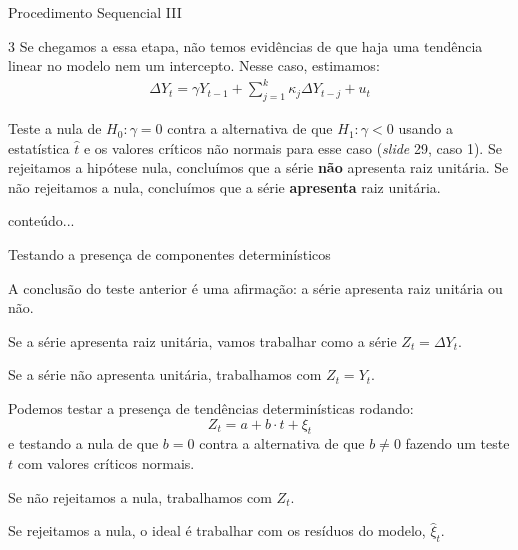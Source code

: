 \documentclass[11pt]{beamer}
\newenvironment{wideenumerate}{\enumerate\addtolength{\itemsep}{10pt}}{\endenumerate}
\newenvironment{halfwideitemize}{\itemize\addtolength{\itemsep}{0.5em}}{\enditemize}
\begin{document}
\begin{frame}{Procedimento Sequencial III}
	\begin{wideenumerate}
		\item[3] Se chegamos a essa etapa, não temos evidências de que haja uma tendência linear no modelo nem um intercepto. Nesse caso, estimamos:
		\begin{equation}
			\begin{aligned}
				\Delta Y_t = \gamma Y_{t-1} +  \sum_{j=1}^k \kappa_j \Delta Y_{t-j} + u_t
			\end{aligned}
		\end{equation}
		
		Teste a nula de $H_0: \gamma = 0$ contra a alternativa de que $H_1: \gamma < 0$ usando a estatística $\hat{t}$ e os valores críticos não normais para esse caso (\textit{slide} 29, caso 1). Se rejeitamos a hipótese nula, concluímos que a série \textbf{não} apresenta raiz unitária. Se não rejeitamos a nula, concluímos que a série \textbf{apresenta} raiz unitária.
		
	\end{wideenumerate}
	
\end{frame}

\begin{frame}{\citet{Elliott1996} }
	conteúdo...
\end{frame}

\begin{frame}{Testando a presença de componentes determinísticos}
	\begin{halfwideitemize}
		\item A conclusão do teste anterior é uma afirmação: a série apresenta raiz unitária ou não.
		\item Se a série apresenta raiz unitária, vamos trabalhar como a série $Z_t = \Delta Y_t$.
		\item Se a série não apresenta unitária, trabalhamos com $Z_t = Y_t$.
		\item Podemos testar a presença de tendências determinísticas rodando:
		\begin{equation}
			Z_t = a + b \cdot t + \xi_t
		\end{equation}
		e testando a nula de que $b=0$ contra a alternativa de que $b \neq 0$ fazendo um teste $t$ com valores críticos normais.
		\begin{halfwideitemize}
			\item Se não rejeitamos a nula, trabalhamos com $Z_t$.
			\item Se rejeitamos a nula, o ideal é trabalhar com os resíduos do modelo, $\hat{\xi}_t$.
		\end{halfwideitemize}
	\end{halfwideitemize}
\end{frame}
\end{document}
